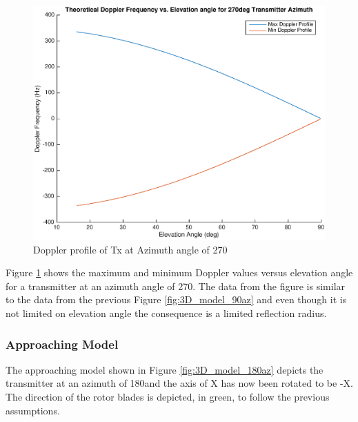 \begin{figure}
	\begin{center}
		\includegraphics[width=15cm]{images/background/3d_geometry_tx_270az_doppler_profile.eps}
		\caption{Doppler profile of Tx at Azimuth angle of 270\textdegree}
		\label{fig:3D_model_270az_doppler}
	\end{center}
\end{figure}

Figure \ref{fig:3D_model_270az_doppler} shows the maximum and minimum Doppler values versus elevation angle for a transmitter at an azimuth angle of 270\textdegree. The data from the figure is similar to the data from the previous Figure \ref{fig:3D_model_90az} and even though it is not limited on elevation angle the consequence is a limited reflection radius.


\subsubsection{Approaching Model}
The approaching model shown in Figure \ref{fig:3D_model_180az} depicts the transmitter at an azimuth of 180\textdegree \space and the axis of X has now been rotated to be -X. The direction of the rotor blades is depicted, in green, to follow the previous assumptions.

